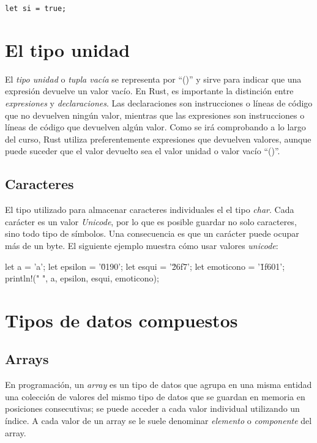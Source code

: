 {\centering \texttt{let si = true;} \par}   

\section{El tipo unidad}
El \textit{tipo unidad} o \textit{tupla vacía} se representa por ``()'' y sirve para indicar que una expresión devuelve un valor vacío. En Rust, es importante la distinción entre \textit{expresiones} y \textit{declaraciones}. Las declaraciones son instrucciones o líneas de código que no devuelven ningún valor, mientras que las expresiones son instrucciones o líneas de código que devuelven algún valor. Como se irá comprobando a lo largo del curso, Rust utiliza preferentemente expresiones que devuelven valores, aunque puede suceder que el valor devuelto sea el valor unidad o valor vacío ``()''.

\subsection{Caracteres}
El tipo utilizado para almacenar caracteres individuales el el tipo \textit{char}. Cada carácter es un valor \textit{Unicode}, por lo que es posible guardar no solo caracteres, sino todo tipo de símbolos. Una consecuencia es que un carácter puede ocupar más de un byte. El siguiente ejemplo muestra cómo usar valores \textit{unicode}:

\vspace{0.7em}
\begin{Codigo}
let a = 'a';
let epsilon = '\u{0190}';
let esqui = '\u{26f7}';
let emoticono = '\u{1f601}';
println!("{} {} {} {}", a, epsilon, esqui, emoticono);
\end{Codigo} 

\section{Tipos de datos compuestos}

\subsection{Arrays}
En programación, un \textit{array} es un tipo de datos que agrupa en una misma entidad una colección de valores del mismo tipo de datos que se guardan en memoria en posiciones consecutivas; se puede acceder a cada valor individual utilizando un índice. A cada valor de un array se le suele denominar \textit{elemento} o \textit{componente} del array.

